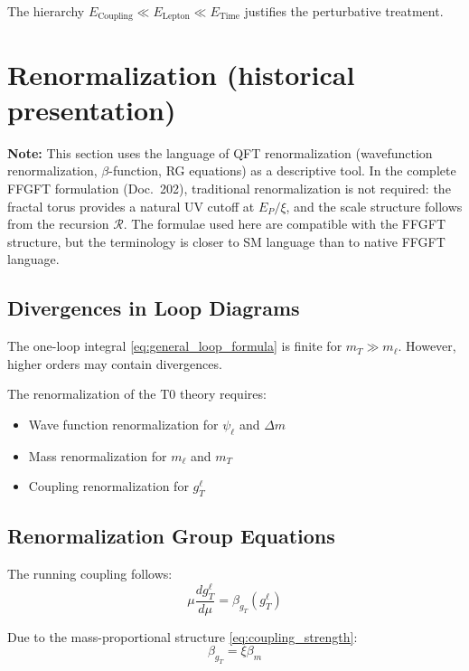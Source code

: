 	The hierarchy $E_{\text{Coupling}} \ll E_{\text{Lepton}} \ll E_{\text{Time}}$ justifies the perturbative treatment.
	
	\section{Renormalization (historical presentation)}

\textbf{Note:} This section uses the language of QFT renormalization (wavefunction renormalization, $\beta$-function, RG equations) as a descriptive tool. In the complete FFGFT formulation (Doc.~202), traditional renormalization is not required: the fractal torus provides a natural UV cutoff at $E_P/\xi$, and the scale structure follows from the recursion $\mathcal{R}$. The formulae used here are compatible with the FFGFT structure, but the terminology is closer to SM language than to native FFGFT language.
	
	\subsection{Divergences in Loop Diagrams}
	
	The one-loop integral \eqref{eq:general_loop_formula} is finite for $m_T \gg m_\ell$. However, higher orders may contain divergences.
	
	The renormalization of the T0 theory requires:
	\begin{itemize}
		\item Wave function renormalization for $\psi_\ell$ and $\Delta m$
		\item Mass renormalization for $m_\ell$ and $m_T$
		\item Coupling renormalization for $g_T^\ell$
	\end{itemize}
	
	\subsection{Renormalization Group Equations}
	
	The running coupling follows:
	\begin{equation}
		\mu \frac{d g_T^\ell}{d\mu} = \beta_{g_T}(g_T^\ell)
		\label{eq:rg_equation}
	\end{equation}
	
	Due to the mass-proportional structure \eqref{eq:coupling_strength}:
	\begin{equation}
		\beta_{g_T} = \xi \beta_m
		\label{eq:beta_relation}
	\end{equation}
	
